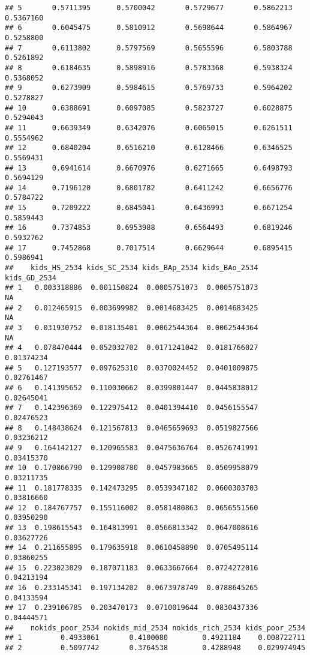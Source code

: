 \documentclass[
]{article}
\begin{document}
\begin{verbatim}
## 5       0.5711395      0.5700042       0.5729677       0.5862213      0.5367160
## 6       0.6045475      0.5810912       0.5698644       0.5864967      0.5258800
## 7       0.6113802      0.5797569       0.5655596       0.5803788      0.5261892
## 8       0.6184635      0.5898916       0.5783368       0.5938324      0.5368052
## 9       0.6273909      0.5984615       0.5769733       0.5964202      0.5278827
## 10      0.6388691      0.6097085       0.5823727       0.6028875      0.5294043
## 11      0.6639349      0.6342076       0.6065015       0.6261511      0.5554962
## 12      0.6840204      0.6516210       0.6128466       0.6346525      0.5569431
## 13      0.6941614      0.6670976       0.6271665       0.6498793      0.5694129
## 14      0.7196120      0.6801782       0.6411242       0.6656776      0.5784722
## 15      0.7209222      0.6845041       0.6436993       0.6671254      0.5859443
## 16      0.7374853      0.6953988       0.6564493       0.6819246      0.5932762
## 17      0.7452868      0.7017514       0.6629644       0.6895415      0.5986941
##    kids_HS_2534 kids_SC_2534 kids_BAp_2534 kids_BAo_2534 kids_GD_2534
## 1   0.003318886  0.001150824  0.0005751073  0.0005751073           NA
## 2   0.012465915  0.003699982  0.0014683425  0.0014683425           NA
## 3   0.031930752  0.018135401  0.0062544364  0.0062544364           NA
## 4   0.078470444  0.052032702  0.0171241042  0.0181766027   0.01374234
## 5   0.127193577  0.097625310  0.0370024452  0.0401009875   0.02761467
## 6   0.141395652  0.110030662  0.0399801447  0.0445838012   0.02645041
## 7   0.142396369  0.122975412  0.0401394410  0.0456155547   0.02476523
## 8   0.148438624  0.121567813  0.0465659693  0.0519827566   0.03236212
## 9   0.164142127  0.120965583  0.0475636764  0.0526741991   0.03415370
## 10  0.170866790  0.129908780  0.0457983665  0.0509958079   0.03211735
## 11  0.181778335  0.142473295  0.0539347182  0.0600303703   0.03816660
## 12  0.184767757  0.155116002  0.0581480863  0.0656551560   0.03950290
## 13  0.198615543  0.164813991  0.0566813342  0.0647008616   0.03627726
## 14  0.211655895  0.179635918  0.0610458890  0.0705495114   0.03860255
## 15  0.223023029  0.187071183  0.0633667664  0.0724272016   0.04213194
## 16  0.233145341  0.197134202  0.0673978749  0.0788645265   0.04133594
## 17  0.239106785  0.203470173  0.0710019644  0.0830437336   0.04444571
##    nokids_poor_2534 nokids_mid_2534 nokids_rich_2534 kids_poor_2534
## 1         0.4933061       0.4100080        0.4921184    0.008722711
## 2         0.5097742       0.3764538        0.4288948    0.029974945

\end{verbatim}
\end{document}
